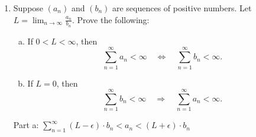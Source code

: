 \documentclass{amsart}
\newtheorem{theorem}{Theorem}
\newtheorem{lemma}[theorem]{Lemma}
\begin{document}
\begin{enumerate}[1.]
\begin{lemma}
\begin{proof}
        \[
            \displaystyle \sum_{k=1}^\infty \max\{a_k, b_k\} \text{ must also converge.}
        \]
    \end{proof}
\end{lemma}
\begin{theorem} 
    If $(a_k)$ is a sequence of non-negative real numbers,
    \[ \sum_{k=1}^{\infty} a_k < \infty \quad \Rightarrow \quad \sum_{k=1}^{\infty} \frac{\sqrt{a_k}}{k} < \infty. \]
    \begin{proof}
        Assume $\sum_{k=1}^{\infty} a_k < \infty$. Then we know that $\sum_{k=1}^{\infty} a_k $ converges.
        We also know that $\sum_{k=1}^{\infty} \frac{1}{k^2}$ converges.

        Consider the sequence 
        \begin{align*}
            \sum_{k=1}^{\infty} \frac{\sqrt{a_k}}{k} &= \sum_{k=1}^{\infty} \sqrt{\frac{1}{k^2} \cdot a_k } \\
            &\leq \sum_{k=1}^{\infty} \max \left\{ \frac{1}{k^2}, a_k \right\} \text{ by Lemma 6.} \\
        \end{align*}
        By Lemma 8, we know that 
        \[
            \sum_{k=1}^{\infty} \max \left\{ \frac{1}{k^2}, a_k \right\} \text{ converges.}
        \]
        Thus, by the comparison test,
        \[
            \sum_{k=1}^{\infty} \frac{\sqrt{a_k}}{k} \text{ must also converge.}
        \]
        So 
        \[
            \sum_{k=1}^{\infty} \frac{\sqrt{a_k}}{k} < \infty
        \]
    \end{proof}
\end{theorem}



\newpage
\item Suppose $(a_n)$ and $(b_n)$ are sequences of positive numbers. Let $\displaystyle L= \lim_{n\to\infty}\frac{a_n}{b_n}$. Prove the following:
\begin{enumerate}[(a)]
\item If $0<L<\infty$, then 
\[ \sum_{n=1}^{\infty} a_n < \infty \quad \Leftrightarrow \quad \sum_{n=1}^{\infty} b_n < \infty.\]
\item If $L=0$, then 
\[ \sum_{n=1}^{\infty} b_n < \infty \quad \Rightarrow \quad \sum_{n=1}^{\infty} a_n < \infty.\]
\end{enumerate}
Part a: $\sum_{n=1}^{\infty} (L - \epsilon)\cdot b_n < a_n < (L + \epsilon)\cdot b_n$


\end{enumerate}
\end{document}

